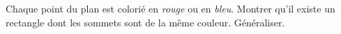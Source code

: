 Chaque point du plan est colorié en \emph{rouge} ou en \emph{bleu}. Montrer qu'il existe un rectangle dont les sommets sont de la même couleur. Généraliser.
